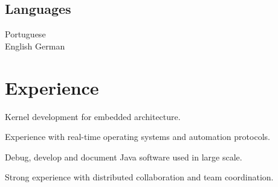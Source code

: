 \documentclass[]{deedy-resume-openfont}
\begin{document}
\begin{minipage}[t]{0.33\textwidth}
\subsection{Languages}
Portuguese \\
English \textbullet{}
German

%
%

\end{minipage} 
\hfill
\begin{minipage}[t]{0.66\textwidth} 

\section{Experience}
\sectionsep

\begin{tightemize}
\item Kernel development for embedded architecture.
\item Experience with real-time operating systems and automation protocols.
\end{tightemize}
\sectionsep

\begin{tightemize}
\item Debug, develop and document Java software used in large scale.
\item Strong experience with distributed collaboration and team coordination.
\end{tightemize}
\sectionsep


\end{minipage}
\end{document}
